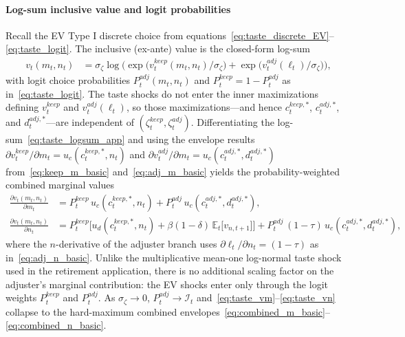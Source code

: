 \paragraph{Log-sum inclusive value and logit probabilities}
Recall the EV Type I discrete choice from equations~\eqref{eq:taste_discrete_EV}--\eqref{eq:taste_logit}. The inclusive (ex-ante) value is the closed-form log-sum
\begin{align}
	v_t(m_t,n_t)
	&= \sigma_\zeta \log\Big(
		\exp\big(v_t^{keep}(m_t,n_t)/\sigma_\zeta\big)
		+ \exp\big(v_t^{adj}(\ell_t)/\sigma_\zeta\big)
	\Big), \label{eq:taste_logsum_app}
\end{align}
with logit choice probabilities $P_t^{adj}(m_t,n_t)$ and $P_t^{keep}=1-P_t^{adj}$ as in~\eqref{eq:taste_logit}. The taste shocks do not enter the inner maximizations defining $v_t^{keep}$ and $v_t^{adj}(\ell_t)$, so those maximizations---and hence $c_t^{keep,\ast}$, $c_t^{adj,\ast}$, and $d_t^{adj,\ast}$---are independent of $(\zeta_t^{keep},\zeta_t^{adj})$. Differentiating the log-sum~\eqref{eq:taste_logsum_app} and using the envelope results $\partial v_t^{keep}/\partial m_t = u_c(c_t^{keep,\ast},n_t)$ and $\partial v_t^{adj}/\partial m_t = u_c(c_t^{adj,\ast},d_t^{adj,\ast})$ from~\eqref{eq:keep_m_basic} and~\eqref{eq:adj_m_basic} yields the probability-weighted combined marginal values
\begin{align}
	\frac{\partial v_t(m_t,n_t)}{\partial m_t}
	&= P_t^{keep}\, u_c(c_t^{keep,\ast},n_t) + P_t^{adj}\, u_c(c_t^{adj,\ast},d_t^{adj,\ast}), \label{eq:taste_vm}\\
	\frac{\partial v_t(m_t,n_t)}{\partial n_t}
	&= P_t^{keep}\Big[u_d(c_t^{keep,\ast},n_t) + \beta(1-\delta)\,\mathbb{E}_t\big[v_{n,t+1}\big]\Big]
	+ P_t^{adj}\,(1-\tau)\, u_c(c_t^{adj,\ast},d_t^{adj,\ast}), \label{eq:taste_vn}
\end{align}
where the $n$-derivative of the adjuster branch uses $\partial \ell_t/\partial n_t=(1-\tau)$ as in~\eqref{eq:adj_n_basic}. Unlike the multiplicative mean-one log-normal taste shock used in the retirement application, there is no additional scaling factor on the adjuster's marginal contribution: the EV shocks enter only through the logit weights $P_t^{keep}$ and $P_t^{adj}$. As $\sigma_\zeta\to 0$, $P_t^{adj}\to\mathcal{I}_t$ and~\eqref{eq:taste_vm}--\eqref{eq:taste_vn} collapse to the hard-maximum combined envelopes~\eqref{eq:combined_m_basic}--\eqref{eq:combined_n_basic}.

